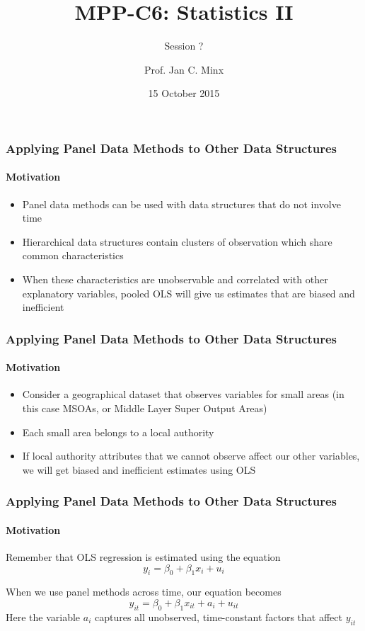\documentclass{beamer}
\title{MPP-C6: Statistics II}
\subtitle{Session ?}
\author{Prof. Jan C. Minx}
\institute[HSoG]{Hertie School of Governance}
\date{15 October 2015}
\begin{document}
  \frame{\titlepage}

  \begin{frame}
    \frametitle{Applying Panel Data Methods to Other Data Structures}
    \framesubtitle{Motivation}
    \begin{itemize}
      \item Panel data methods can be used with data structures that do not involve time
      \item Hierarchical data structures contain clusters of observation which share common characteristics
      \item When these characteristics are unobservable and correlated with other explanatory variables, pooled OLS will give us estimates that are biased and inefficient
    \end{itemize}
  \end{frame}
  
  \begin{frame}
    \frametitle{Applying Panel Data Methods to Other Data Structures}
    \framesubtitle{Motivation}
    \begin{itemize}
      \item Consider a geographical dataset that observes variables for small areas (in this case MSOAs, 
      or Middle Layer Super Output Areas)
      \item Each small area belongs to a local authority
      \item If local authority attributes that we cannot observe affect our other variables, we will get biased and inefficient estimates using OLS
    \end{itemize}
  \end{frame}
  
  \begin{frame}
    \frametitle{Applying Panel Data Methods to Other Data Structures}
    \framesubtitle{Motivation}
    Remember that OLS regression is estimated using the equation
    $$ y_{i} = \beta_{0} + \beta_{1}x_{i} + u_{i} $$
    
    When we use panel methods across time, our equation becomes
    $$ y_{it} = \beta_{0} + \beta_{1}x_{it} + a_{i} + u_{it} $$
    Here the variable $a_{i}$ captures all unobserved, time-constant factors that affect $y_{it}$
  \end{frame}
    
\end{document}
